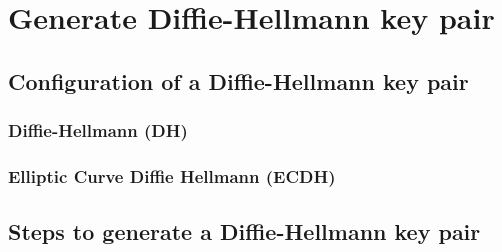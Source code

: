 \chapter{Generate Diffie-Hellmann key pair}

\section{Configuration of a Diffie-Hellmann key pair}
\subsection{Diffie-Hellmann (DH)}
\subsection{Elliptic Curve Diffie Hellmann (ECDH)}


\section{Steps to generate a Diffie-Hellmann key pair}